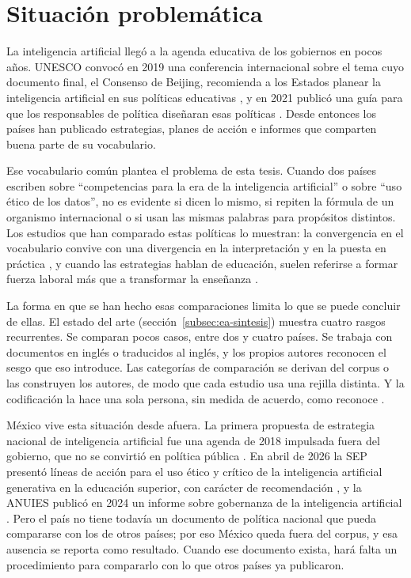 \section{Situación problemática}
\label{sec:problematica}

La inteligencia artificial llegó a la agenda educativa de los gobiernos en pocos años.
UNESCO convocó en 2019 una conferencia internacional sobre el tema cuyo documento final, el
Consenso de Beijing, recomienda a los Estados planear la inteligencia artificial en sus
políticas educativas \citep{unesco2019beijing}, y en 2021 publicó una guía para que los
responsables de política diseñaran esas políticas \citep{miao2021guidance}. Desde entonces
los países han publicado estrategias, planes de acción e informes que comparten buena parte
de su vocabulario.

Ese vocabulario común plantea el problema de esta tesis. Cuando dos países escriben sobre
``competencias para la era de la inteligencia artificial'' o sobre ``uso ético de los
datos'', no es evidente si dicen lo mismo, si repiten la fórmula de un organismo
internacional o si usan las mismas palabras para propósitos distintos. Los estudios que
han comparado estas políticas lo muestran: la convergencia en el vocabulario convive con
una divergencia en la interpretación y en la puesta en práctica
\citep{jobin2019landscape, fjeld2020principled}, y cuando las estrategias hablan de
educación, suelen referirse a formar fuerza laboral más que a transformar la enseñanza
\citep{schiff2022education}.

La forma en que se han hecho esas comparaciones limita lo que se puede concluir de ellas.
El estado del arte (sección~\ref{subsec:ea-sintesis}) muestra cuatro rasgos recurrentes. Se
comparan pocos casos, entre dos y cuatro países. Se trabaja con documentos en inglés o
traducidos al inglés, y los propios autores reconocen el sesgo que eso introduce. Las
categorías de comparación se derivan del corpus o las construyen los autores, de modo que
cada estudio usa una rejilla distinta. Y la codificación la hace una sola persona, sin
medida de acuerdo, como reconoce \citet{schiff2022education}.

México vive esta situación desde afuera. La primera propuesta de estrategia nacional de
inteligencia artificial fue una agenda de 2018 impulsada fuera del gobierno, que no se
convirtió en política pública \citep{cminds2018iamexico}. En abril de 2026 la SEP presentó
líneas de acción para el uso ético y crítico de la inteligencia artificial generativa en la
educación superior, con carácter de recomendación \citep{sep2026ia}, y la ANUIES publicó en
2024 un informe sobre gobernanza de la inteligencia artificial \citep{anuies2024gobernanza}.
Pero el país no tiene todavía un documento de política nacional que pueda compararse con los
de otros países; por eso México queda fuera del corpus, y esa ausencia se reporta como
resultado. Cuando ese documento exista, hará falta un procedimiento para compararlo con lo
que otros países ya publicaron.

